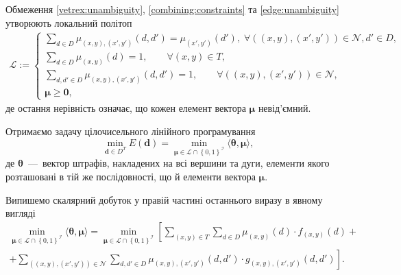 Обмеження \eqref{vetrex:unambiguity}, \eqref{combining:constraints} та
\eqref{edge:unambiguity} утворюють локальний політоп
\begin{equation} \label{local:polytop}
\begin{gathered}
    \mathcal{L} :=
    \begin{cases}
        \sum \limits_{d \in D}
            \mu_{\left(x, y \right), \left(x', y' \right)} \left(d, d' \right) =
            \mu_{\left(x', y' \right)} \left(d' \right), \;
        \forall
        \left( \left(x, y \right), \left(x',y' \right) \right) \in \mathcal{N},
        d' \in D, \\
        \sum \limits_{d \in D} \mu_{\left( x, y \right)} \left( d \right) = 1,
        \qquad \forall \left(x, y \right) \in T, \\
        \sum \limits_{d, d' \in D}
            \mu_{\left(x, y \right), \left(x', y' \right)} \left(
                d, d'
            \right) = 1, \qquad \forall
            \left(\left(x, y \right), \left(x', y' \right) \right) \in
                \mathcal{N}, \\
        \pmb{\mu} \ge \pmb{0},
    \end{cases}
\end{gathered}
\end{equation}
де остання нерівність означає, що кожен елемент вектора $\pmb{\mu}$ невід'ємний.

Отримаємо задачу цілочисельного лінійного програмування
\begin{equation*}
    \min \limits_{\pmb{d} \in D^T} E \left( \pmb{d} \right) =
    \min \limits_{\pmb{\mu} \in \mathcal{L} \cap \left\{ 0, 1 \right\}^{\mathcal{I}}}
        \langle \pmb{\theta}, \pmb{\mu} \rangle,
\end{equation*}
де $\pmb{\theta}$~---~вектор штрафів, накладених на всі вершини та дуги,
елементи якого розташовані в тій же послідовності,
що й елементи вектора $\pmb{\mu}$.

Випишемо скалярний добуток у правій частині останнього виразу в явному вигляді
\begin{equation} \label{ILP:MAP:inference}
\begin{gathered}
    \min \limits_{\pmb{\mu} \in \mathcal{L} \cap \left\{ 0, 1 \right\}^{\mathcal{I}}}
        \langle \pmb{\theta}, \pmb{\mu} \rangle =
    \min \limits_{\pmb{\mu} \in \mathcal{L} \cap \left\{ 0, 1 \right\}^{\mathcal{I}}}
        \left[
            \sum \limits_{\left(x, y \right) \in T}
                \sum \limits_{d \in D}
                    \mu_{\left(x, y \right)} \left(d \right) \cdot
                    f_{\left(x, y \right)} \left( d \right) + \right. \\
            + \left.
            \sum \limits_{\left(\left(x, y \right), \left(x', y' \right) \right) \in \mathcal{N}}
                \sum \limits_{d, d' \in D}
                    \mu_{\left(x, y \right), \left(x', y' \right)} \left(
                        d, d'
                    \right) \cdot
                    g_{\left(x, y \right), \left(x', y' \right)} \left(
                        d, d'
                    \right)
        \right].
\end{gathered}
\end{equation}

